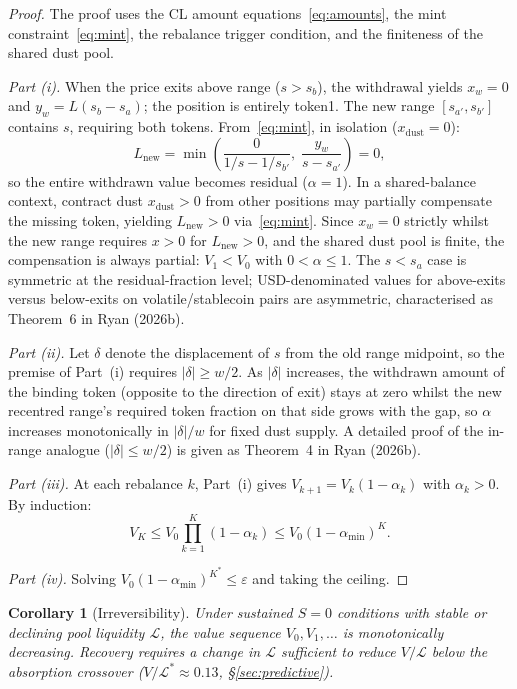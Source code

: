 \documentclass[11pt,a4paper]{article}
\newtheorem*{corollary}{Corollary}
\begin{document}
\begin{proof}
The proof uses the CL amount equations~\eqref{eq:amounts}, the mint constraint~\eqref{eq:mint}, the rebalance trigger condition, and the finiteness of the shared dust pool.

\emph{Part (i).} When the price exits above range ($s > s_b$), the withdrawal yields $x_w = 0$ and $y_w = L(s_b - s_a)$; the position is entirely token1. The new range $[s_{a'}, s_{b'}]$ contains $s$, requiring both tokens. From~\eqref{eq:mint}, in isolation ($x_{\text{dust}} = 0$):
\begin{equation}\label{eq:newliq}
L_{\text{new}} = \min\!\left(\frac{0}{1/s - 1/s_{b'}}, \; \frac{y_w}{s - s_{a'}}\right) = 0,
\end{equation}
so the entire withdrawn value becomes residual ($\alpha = 1$). In a shared-balance context, contract dust $x_{\text{dust}} > 0$ from other positions may partially compensate the missing token, yielding $L_{\text{new}} > 0$ via~\eqref{eq:mint}. Since $x_w = 0$ strictly whilst the new range requires $x > 0$ for $L_{\text{new}} > 0$, and the shared dust pool is finite, the compensation is always partial: $V_1 < V_0$ with $0 < \alpha \leq 1$. The $s < s_a$ case is symmetric at the residual-fraction level; USD-denominated values for above-exits versus below-exits on volatile/stablecoin pairs are asymmetric, characterised as Theorem~6 in Ryan (2026b).

\emph{Part (ii).} Let $\delta$ denote the displacement of $s$ from the old range midpoint, so the premise of Part~(i) requires $|\delta| \geq w/2$. As $|\delta|$ increases, the withdrawn amount of the binding token (opposite to the direction of exit) stays at zero whilst the new recentred range's required token fraction on that side grows with the gap, so $\alpha$ increases monotonically in $|\delta|/w$ for fixed dust supply. A detailed proof of the in-range analogue ($|\delta| \leq w/2$) is given as Theorem~4 in Ryan (2026b).

\emph{Part (iii).} At each rebalance $k$, Part~(i) gives $V_{k+1} = V_k(1 - \alpha_k)$ with $\alpha_k > 0$. By induction:
\[
V_K \leq V_0 \prod_{k=1}^{K}(1 - \alpha_k) \leq V_0(1 - \alpha_{\min})^K.
\]

\emph{Part (iv).} Solving $V_0(1 - \alpha_{\min})^{K^*} \leq \varepsilon$ and taking the ceiling.
\end{proof}

\begin{corollary}[Irreversibility]\label{cor:irreversibility}
Under sustained $S = 0$ conditions with stable or declining pool liquidity $\mathcal{L}$, the value sequence $V_0, V_1, \ldots$ is monotonically decreasing. Recovery requires a change in $\mathcal{L}$ sufficient to reduce $V/\mathcal{L}$ below the absorption crossover ($V/\mathcal{L}^* \approx 0.13$, \S\ref{sec:predictive}).
\end{corollary}
\end{document}
